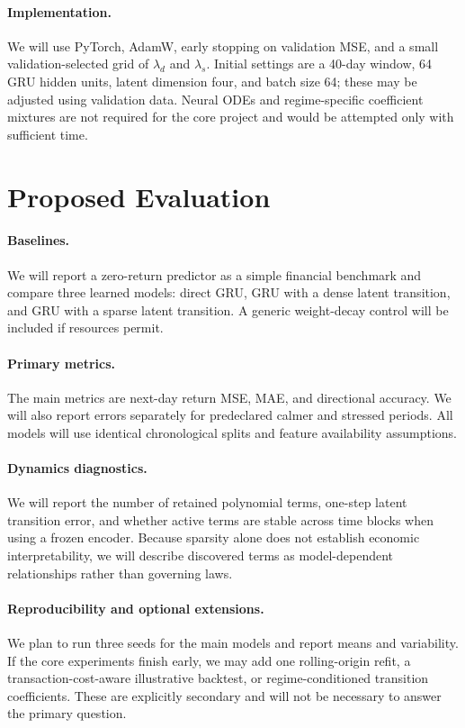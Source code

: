 \documentclass{article}
\begin{document}
\paragraph{Implementation.}
We will use PyTorch, AdamW, early stopping on validation MSE, and a small validation-selected grid of $\lambda_d$ and $\lambda_s$. Initial settings are a 40-day window, 64 GRU hidden units, latent dimension four, and batch size 64; these may be adjusted using validation data. Neural ODEs and regime-specific coefficient mixtures are not required for the core project and would be attempted only with sufficient time.

\section{Proposed Evaluation}
\paragraph{Baselines.}
We will report a zero-return predictor as a simple financial benchmark and compare three learned models: direct GRU, GRU with a dense latent transition, and GRU with a sparse latent transition. A generic weight-decay control will be included if resources permit.

\paragraph{Primary metrics.}
The main metrics are next-day return MSE, MAE, and directional accuracy. We will also report errors separately for predeclared calmer and stressed periods. All models will use identical chronological splits and feature availability assumptions.

\paragraph{Dynamics diagnostics.}
We will report the number of retained polynomial terms, one-step latent transition error, and whether active terms are stable across time blocks when using a frozen encoder. Because sparsity alone does not establish economic interpretability, we will describe discovered terms as model-dependent relationships rather than governing laws.

\paragraph{Reproducibility and optional extensions.}
We plan to run three seeds for the main models and report means and variability. If the core experiments finish early, we may add one rolling-origin refit, a transaction-cost-aware illustrative backtest, or regime-conditioned transition coefficients. These are explicitly secondary and will not be necessary to answer the primary question.
\end{document}
